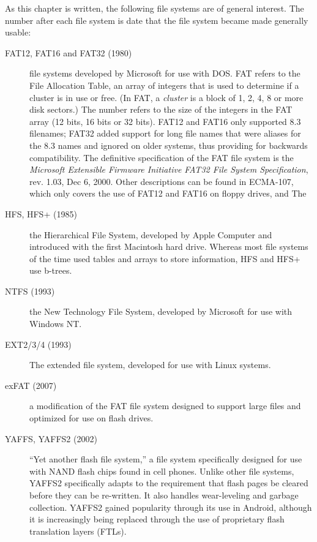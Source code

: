 As this chapter is written, the following file systems are of general
interest. The number after each file system is date that the file
system became made generally usable:
\begin{description}
\item[FAT12, FAT16 and FAT32 (1980)] file systems developed by Microsoft for use with
  DOS. FAT refers to the File Allocation Table, an array of integers
  that is used to determine if a cluster is in use or free. (In FAT, a
  \emph{cluster} is a block of 1, 2, 4, 8 or more disk sectors.) The number
  refers to the size of the integers in the FAT array (12 bits, 16 bits or
  32 bits).  FAT12 and FAT16 only supported 8.3 filenames; FAT32
  added support for long file names that were aliases for the 8.3
  names and ignored on older systems, thus providing for backwards
  compatibility. The definitive specification of the FAT file system is
  the \emph{Microsoft Extensible Firmware Initiative FAT32 File System
    Specification}, rev. 1.03, Dec 6, 2000\cite{microsoft-efi}. Other
  descriptions can be found in ECMA-107\cite{ECMA-107}, which only
  covers the use of FAT12 and FAT16 on floppy drives, and The
  
\item[HFS, HFS+ (1985)] the Hierarchical File System, developed by Apple
  Computer and introduced with the first Macintosh hard
  drive. Whereas most file systems of the time used tables and arrays to store
  information, HFS and HFS+ use b-trees.
\item[NTFS (1993)] the New Technology File System, developed by
  Microsoft for use with Windows NT. 
\item[EXT2/3/4 (1993)] The extended file system, developed for use with Linux systems.
\item[exFAT (2007)] a modification of the FAT file system designed to
  support large files and optimized for use on flash drives.
\item[YAFFS, YAFFS2 (2002)] ``Yet another flash file system,'' a file
  system specifically designed for use with NAND flash chips found in
  cell phones. Unlike other file systems, YAFFS2 specifically adapts
  to the requirement that flash pages be cleared before they can be
  re-written. It also handles wear-leveling and garbage collection.
  YAFFS2 gained popularity through its use in Android, although it is
  increasingly being replaced through the use of proprietary flash
  translation layers (FTLs).
\end{description}

